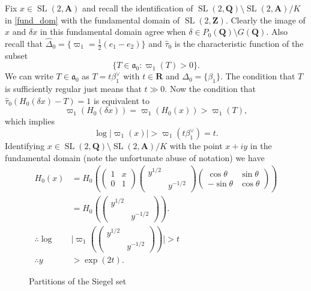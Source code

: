 \documentclass[11pt]{amsart}
\def\A{\mathbf A}
\def\Q{\mathbf Q}
\def\R{\mathbf R}
\def\Z{\mathbf Z}
\def\aaa{\mathfrak a}
\def\cb#1{{\color{blue}#1}}
\def\bs{\setminus} 			%
\def\mod#1{\lvert #1 \rvert} %
\def\sl{\operatorname{SL}}
\theoremstyle{remark}
\begin{document}
\cb{Fix $x \in \sl(2, \A)$ and recall the identification of $\sl(2, \Q)\bs \sl(2, \A) / K$ in \cref{fund_dom} with the fundamental domain of $\sl(2, \Z)$. Clearly the image of $x$ and $\delta x$ in this fundamental domain agree when $\delta \in P_0(\Q) \bs G(\Q)$. 
Also recall that $\hat\Delta_0 = \{\varpi_1 = \frac{1}{2}(e_1 - e_2) \}$ and $\hat \tau_0$ is the characteristic function of the subset 
\[ \{ T \in \aaa_0 : \varpi_1(T) > 0 \}. \]
We can write $T \in \aaa_0$ as $T = t \beta_1^\vee$ with $t \in \R$ and $\Delta_0 = \{\beta_1\}$. The condition that $T$ is sufficiently regular just means that $t \gg 0$. Now the condition that $\hat\tau_0 (H_0(\delta x) - T) = 1$ is equivalent to 
\[ \varpi_1(H_0(\delta x)) = \varpi_1(H_0(x)) > \varpi_1(T), \]
which implies
\[ \log \mod{\varpi_1(x)} > \varpi_1(t \beta_1^\vee) = t. \]
Identifying $x \in \sl(2, \Q)\bs \sl(2, \A) / K$ with the point $x + iy$ in the fundamental domain (note the unfortunate abuse of notation) we have
\begin{equation} \label{x_decom}
	\begin{aligned} 
		H_0(x) & = H_0(\begin{pmatrix} 1 & x \\ 0 & 1 \end{pmatrix} \begin{pmatrix} y^{1/2} & \\ & y^{-1/2} \end{pmatrix} \begin{pmatrix} \cos \theta & \sin \theta \\ -\sin \theta & \cos \theta \end{pmatrix}) \\
			& = H_0(\begin{pmatrix} y^{1/2} & \\ & y^{-1/2} \end{pmatrix}). \\
	\therefore \log & \mod{\varpi_1(\begin{pmatrix} y^{1/2} & \\ & y^{-1/2} \end{pmatrix})} > t \\
	\therefore y & > \exp(2t).
	\end{aligned}
\end{equation}
}

\begin{figure}
\centering
\caption{Partitions of the Siegel set} \label{fig:sd}
\end{figure}
\end{document}
